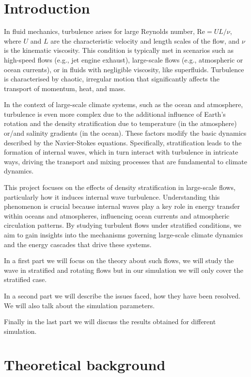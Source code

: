 \documentclass[final,5p,times,twocolumn,authoryear]{elsarticle}
\begin{document}
\section{Introduction}
\label{introduction}

In fluid mechanics, turbulence arises for large Reynolds number, $\mathrm{Re} = UL/\nu$, where $U$ and $L$ are the characteristic velocity and length scales of the flow, and $\nu$ is the kinematic viscosity. This condition is typically met in scenarios such as high-speed flows (e.g., jet engine exhaust), large-scale flows (e.g., atmospheric or ocean currents), or in fluids with negligible viscosity, like superfluids. Turbulence is characterised by chaotic, irregular motion that significantly affects the transport of momentum, heat, and mass.

In the context of large-scale climate systems, such as the ocean and atmosphere, turbulence is even more complex due to the additional influence of Earth’s rotation and the density stratification due to temperature (in the atmosphere) or/and salinity gradients (in the ocean). These factors modify the basic dynamics described by the Navier-Stokes equations. Specifically, stratification leads to the formation of internal waves, which in turn interact with turbulence in intricate ways, driving the transport and mixing processes that are fundamental to climate dynamics.

This project focuses on the effects of density stratification in large-scale flows, particularly how it induces internal wave turbulence. Understanding this phenomenon is crucial because internal waves play a key role in energy transfer within oceans and atmospheres, influencing ocean currents and atmospheric circulation patterns. By studying turbulent flows under stratified conditions, we aim to gain insights into the mechanisms governing large-scale climate dynamics and the energy cascades that drive these systems.

In a first part we will focus on the theory about such flows, we will study the wave in stratified and rotating flows but in our simulation we will only cover the stratified case.

In a second part we will describe the issues faced, how they have been resolved. We will also talk about the simulation parameters.

Finally in the last part we will discuss the results obtained for different simulation. 

\section{Theoretical background}
\end{document}
